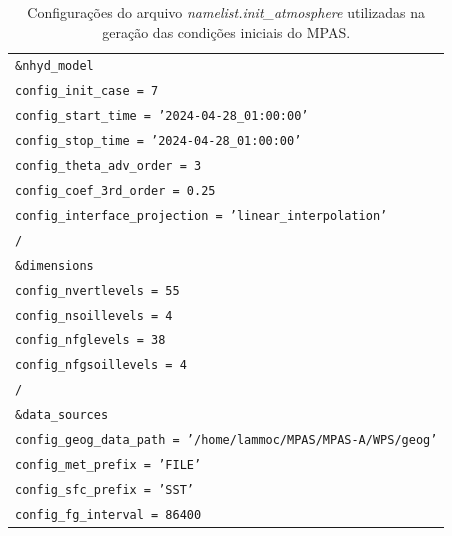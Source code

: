 \documentclass[12pt,a4paper,oneside]{book}
\providecommand{\arraybackslash}{\tabularnewline}
\begin{document}
\begin{longtable}[]{@{}
  >{\raggedright\arraybackslash}p{}@{}}
\caption{Configurações do arquivo \textit{namelist.init\_atmosphere} utilizadas na geração das condições iniciais do MPAS.}\label{tab:tabela-01}\\
\toprule\noalign{}
\endfirsthead
\endhead
\bottomrule\noalign{}
\endlastfoot
\texttt{\&nhyd\_model} \\
\texttt{\hspace*{1em}config\_init\_case = 7} \\
\texttt{\hspace*{1em}config\_start\_time = '2024-04-28\_01:00:00'} \\
\texttt{\hspace*{1em}config\_stop\_time = '2024-04-28\_01:00:00'} \\
\texttt{\hspace*{1em}config\_theta\_adv\_order = 3} \\
\texttt{\hspace*{1em}config\_coef\_3rd\_order = 0.25} \\
\texttt{\hspace*{1em}config\_interface\_projection = 'linear\_interpolation'} \\
\texttt{/} \\
\texttt{\&dimensions} \\
\texttt{\hspace*{1em}config\_nvertlevels = 55} \\
\texttt{\hspace*{1em}config\_nsoillevels = 4} \\
\texttt{\hspace*{1em}config\_nfglevels = 38} \\
\texttt{\hspace*{1em}config\_nfgsoillevels = 4} \\
\texttt{/} \\
\texttt{\&data\_sources} \\
\texttt{\hspace*{1em}config\_geog\_data\_path = '/home/lammoc/MPAS/MPAS-A/WPS/geog'} \\
\texttt{\hspace*{1em}config\_met\_prefix = 'FILE'} \\
\texttt{\hspace*{1em}config\_sfc\_prefix = 'SST'} \\
\texttt{\hspace*{1em}config\_fg\_interval = 86400} \\

\end{longtable}
\end{document}
